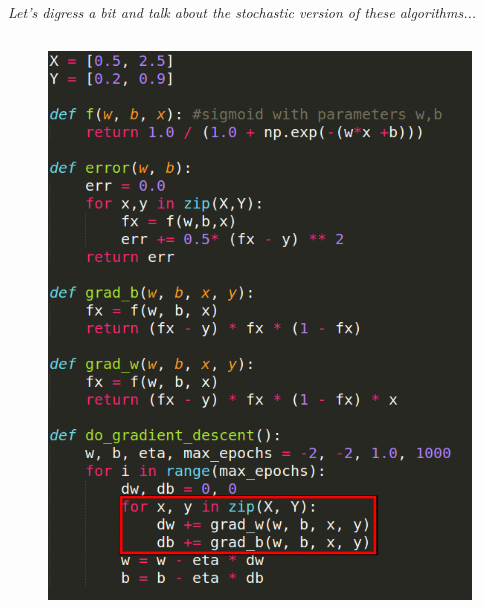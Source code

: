 \begin{frame}
\end{frame}

\begin{frame}
	\fontsize{16pt}{7.2}\selectfont
	\textit{Let's digress a bit and talk about the stochastic version of these algorithms...}
\end{frame}

\begin{frame}
	\begin{columns}
		\begin{overlayarea}{\textwidth}{\textheight}
			\vspace{-0.15in}
			\begin{figure}
				\includegraphics[scale=0.3]{images/module6/pseudo_code_sgd_crop_highlight.png}
			\end{figure}
		\end{overlayarea}
		

\end{columns}
\end{frame}
